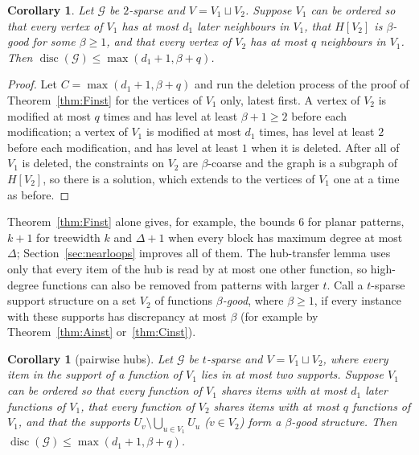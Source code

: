 \documentclass[11pt,letterpaper]{article}
\newtheorem{corollary}[theorem]{Corollary}
\theoremstyle{definition}
\newcommand{\cG}{\mathcal{G}}
\DeclareMathOperator{\disc}{disc}
\begin{document}
\begin{corollary}\label{cor:hybrid}
Let $\cG$ be $2$-sparse and $V=V_1\sqcup V_2$. Suppose $V_1$ can be ordered so that every vertex
of $V_1$ has at most $d_1$ later neighbours in $V_1$, that $H[V_2]$ is $\beta$-good for some
$\beta\ge1$, and that every vertex of $V_2$ has at most $q$ neighbours in $V_1$. Then
$\disc(\cG)\le\max(d_1+1,\beta+q)$.
\end{corollary}

\begin{proof}
Let $C=\max(d_1+1,\beta+q)$ and run the deletion process of the proof of
Theorem~\ref{thm:Finst} for the vertices of $V_1$ only, latest first. A vertex of $V_2$ is modified
at most $q$ times and has level at least $\beta+1\ge2$ before each modification; a vertex of $V_1$
is modified at most $d_1$ times, has level at least $2$ before each modification, and has level at
least $1$ when it is deleted. After all of $V_1$ is deleted, the constraints on $V_2$ are
$\beta$-coarse and the graph is a subgraph of $H[V_2]$, so there is a solution, which extends to
the vertices of $V_1$ one at a time as before.
\end{proof}

Theorem~\ref{thm:Finst} alone gives, for example, the bounds $6$ for planar patterns, $k+1$ for
treewidth $k$ and $\Delta+1$ when every block has maximum degree at most $\Delta$;
Section~\ref{sec:nearloops} improves all of them.
The hub-transfer lemma uses only that every item of the hub is read by at most one other function,
so high-degree functions can also be removed from patterns with larger $t$. Call a $t$-sparse
support structure on a set $V_2$ of functions \emph{$\beta$-good}, where $\beta\ge1$, if every
instance with these supports has discrepancy at most $\beta$ (for example by
Theorem~\ref{thm:Ainst} or~\ref{thm:Cinst}).

\begin{corollary}[pairwise hubs]\label{cor:pairwise}
Let $\cG$ be $t$-sparse and $V=V_1\sqcup V_2$, where every item in the support of a function of
$V_1$ lies in at most two supports. Suppose $V_1$ can be ordered so that every function of $V_1$
shares items with at most $d_1$ later functions of $V_1$, that every function of $V_2$ shares items
with at most $q$ functions of $V_1$, and that the supports $U_v\setminus\bigcup_{u\in V_1}U_u$
($v\in V_2$) form a $\beta$-good structure. Then $\disc(\cG)\le\max(d_1+1,\beta+q)$.
\end{corollary}
\end{document}
